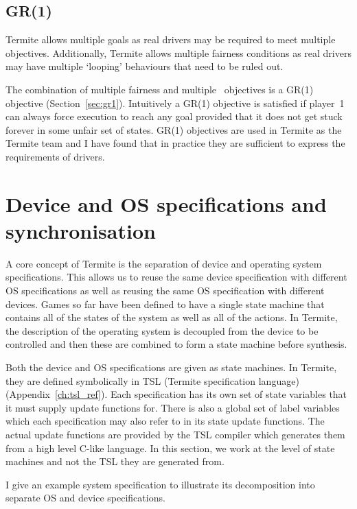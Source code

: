 \subsection{GR(1)}

Termite allows multiple goals as real drivers may be required to meet multiple objectives. Additionally, Termite allows multiple fairness conditions as real drivers may have multiple `looping' behaviours that need to be ruled out.

The combination of multiple fairness and multiple \buchi\ objectives is a GR(1) objective (Section~\ref{sec:gr1}). Intuitively a GR(1) objective is satisfied if player~1 can always force execution to reach any goal provided that it does not get stuck forever in some unfair set of states. GR(1) objectives are used in Termite as the Termite team and I have found that in practice they are sufficient to express the requirements of drivers.

\section{Device and OS specifications and synchronisation}
\label{sec:composition}

A core concept of Termite is the separation of device and operating system specifications. This allows us to reuse the same device specification with different OS specifications as well as reusing the same OS specification with different devices. Games so far have been defined to have a single state machine that contains all of the states of the system as well as all of the actions. In Termite, the description of the operating system is decoupled from the device to be controlled and then these are combined to form a state machine before synthesis.

Both the device and OS specifications are given as state machines. In Termite, they are defined symbolically in TSL (Termite specification language) (Appendix~\ref{ch:tsl_ref}). Each specification has its own set of state variables that it must supply update functions for. There is also a global set of label variables which each specification may also refer to in its state update functions. The actual update functions are provided by the TSL compiler which generates them from a high level C-like language. In this section, we work at the level of state machines and not the TSL they are generated from.

I give an example system specification to illustrate its decomposition into separate OS and device specifications. 

